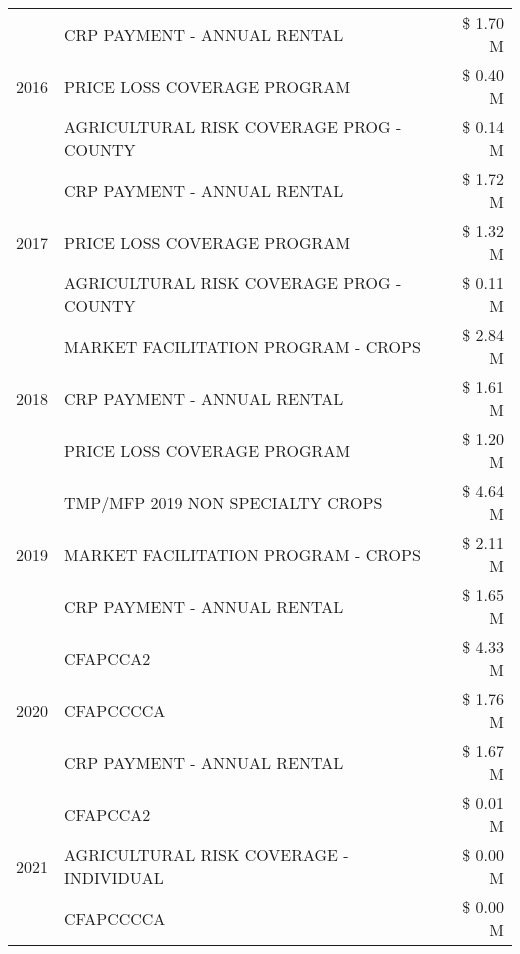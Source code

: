 \begin{tabular}{llr}
\multirow[t]{3}{*}{2016} & CRP PAYMENT - ANNUAL RENTAL & \$ 1.70 M \\
 & PRICE LOSS COVERAGE PROGRAM & \$ 0.40 M \\
 & AGRICULTURAL RISK COVERAGE PROG - COUNTY & \$ 0.14 M \\
\cline{1-3}
\multirow[t]{3}{*}{2017} & CRP PAYMENT - ANNUAL RENTAL & \$ 1.72 M \\
 & PRICE LOSS COVERAGE PROGRAM & \$ 1.32 M \\
 & AGRICULTURAL RISK COVERAGE PROG - COUNTY & \$ 0.11 M \\
\cline{1-3}
\multirow[t]{3}{*}{2018} & MARKET FACILITATION PROGRAM - CROPS & \$ 2.84 M \\
 & CRP PAYMENT - ANNUAL RENTAL & \$ 1.61 M \\
 & PRICE LOSS COVERAGE PROGRAM & \$ 1.20 M \\
\cline{1-3}
\multirow[t]{3}{*}{2019} & TMP/MFP 2019 NON SPECIALTY CROPS & \$ 4.64 M \\
 & MARKET FACILITATION PROGRAM - CROPS & \$ 2.11 M \\
 & CRP PAYMENT - ANNUAL RENTAL & \$ 1.65 M \\
\cline{1-3}
\multirow[t]{3}{*}{2020} & CFAPCCA2 & \$ 4.33 M \\
 & CFAPCCCCA & \$ 1.76 M \\
 & CRP PAYMENT - ANNUAL RENTAL & \$ 1.67 M \\
\cline{1-3}
\multirow[t]{3}{*}{2021} & CFAPCCA2 & \$ 0.01 M \\
 & AGRICULTURAL RISK COVERAGE - INDIVIDUAL & \$ 0.00 M \\
 & CFAPCCCCA & \$ 0.00 M \\
\cline{1-3}
\bottomrule
\end{tabular}
